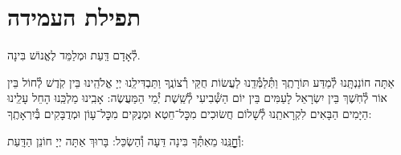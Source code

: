 \documentclass[twoside, openany, parskip=half, 11pt]{book}
\begin{document}
\boruchhashemleolam

\yerueinnu

\halfkaddish

\section*{ תפילת העמידה }


\amidaopening{\ayt}{}

לְ֯אָדָם דַּֽעַת וּמְלַמֵּד לֶאֱנוֹשׁ בִּינָה.
\begin{narrow}
אַתָּה חוֹנַנְתָּֽנוּ לְ֯מַדַּע תּוֹרָתֶֽךָ וַתְּ֯לַמְּ֯דֵֽנוּ לַעֲשׂוֹת חֻקֵּי רְ֯צוֹנֶֽךָ וַתַּבְדִּילֵֽנוּ יְיָ אֱלֹהֵֽינוּ בֵּין קֹֽדֶשׁ לְ֯חוֹל בֵּין אוֹר לְ֯חֹֽשֶׁךְ בֵּין יִשְׂרָאֵל לָעַמִּים בֵּין יוֹם הַשְּׁ֯בִיעִי לְ֯שֵֽׁשֶׁת יְ֯מֵי הַמַּעֲשֶׂה: אָבִֽינוּ מַלְכֵּֽנוּ הָחֵל עָלֵֽינוּ הַיָּמִים הַבָּאִים לִקְרָאתֵֽנוּ לְ֯שָׁלוֹם חֲשׂוּכִים מִכׇּל־חֵטְא וּמְנֻקִּים מִכׇּל־עָוֹן וּמְדֻבָּקִים בְּ֯יִרְאָתֶֽךָ:\\
\end{narrow}
וְ֯חׇׇׇׇׇׇׇׇנֵּֽנוּ מֵאִתְּ֯ךָ בִּינָה דֵּעָה וְ֯הַשְׂכֵּל: בָּרוּךְ אַתָּה יְיָ חוֹנֵן הַדָּֽעַת:

\weekdaysateshuva

\weekdaysaselichah

\weekdaysageulah

\weekdaysarefuah

\weekdaysaberacha

\weekdaysashofar

\weekdaysamishpat

\weekdaysaminim

\weekdaysatzadikim

\weekdaysayerushelayim

\weekdaysamalchus

\weekdaysashemakoleinu

\retzeh

\clearpage

\vspace{-\baselineskip}
\yaalehveyavo

\zion

\newcommand{\maarivmodim}{
\firstword{מוֹדִים}
אֲנַֽחְנוּ לָךְ שָׁאַתָּה הוּא יְיָ אֱלֹהֵֽינוּ וֵאלֹהֵי אֲבוֹתֵֽינוּ לְ֯עוֹלָם וָעֶד צוּר חַיֵּֽינוּ מָגֵן יִשְׁעֵֽנוּ אַתָּה הוּא לְ֯דוֹר וָדוֹר: נוֹדֶה לְּ֯ךָ וּנְסַפֵּר תְּ֯הִלָּתֶֽךָ עַל חַיֵּֽינוּ הַמְּ֯סוּרִים בְּ֯יָדֶֽךָ וְ֯עַל נִשְׁמוֹתֵֽינוּ הַפְּ֯קוּדוֹת לָךְ וְ֯עַל נִסֶּֽיךָ שֶׁבְּ֯כׇל־יוֹם עִמָּֽנוּ וְ֯עַל נִפְלְ֯אוֹתֶֽיךָ וְ֯טוֹבוֹתֶֽיךָ שֶׁבְּ֯כׇל־עֵת עֶֽרֶב וָבֹֽקֶר וְ֯צׇׇׇׇׇׇׇׇׇׇׇׇׇׇׇׇהֳרָֽיִם: הַטּוֹב כִּי לֹא כָלוּ רַחֲמֶֽיךָ וְ֯הַמְ֯רַחֵם כִּי לֹא תַֽמּוּ חֲסָדֶֽיךָ מֵעוֹלָם קִוִֽינוּ לָךְ:
}
\end{document}
